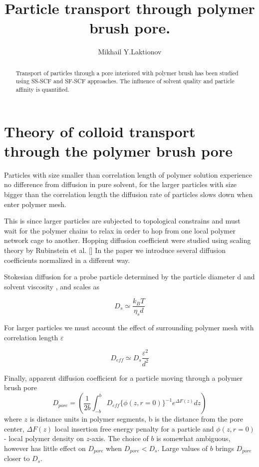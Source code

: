 \documentclass[12pt,a4paper]{article}
\begin{document}
\title{Particle transport through polymer brush pore.}

\author{Mikhail Y.Laktionov}

\maketitle

\begin{abstract}
Transport of particles through a pore interiored with polymer brush has been studied using SS-SCF and SF-SCF approaches. 
The influence of solvent quality and particle affinity is quantified.
\end{abstract}

\section{Theory of colloid transport through the polymer brush pore}

Particles with size smaller than correlation length  of polymer solution experience no difference from diffusion in pure solvent, for the larger particles with size bigger than the correlation length the diffusion rate of particles slows down when enter polymer mesh.

This is since larger particles are subjected to topological constrains and must wait for the polymer chains to relax in order to hop from one local polymer network cage to another.
Hopping diffusion coefficient were studied using scaling theory by Rubinstein et al. []
In the paper we introduce several diffusion coefficients normalized in a different way.

Stokesian diffusion for a probe particle determined by the particle diameter d and solvent viscosity , and scales as

\begin{equation}
    D_s \simeq \frac{k_B T}{\eta_s d}
\end{equation}

For larger particles we must account the effect of surrounding polymer mesh with correlation length $\varepsilon$

\begin{equation}
    D_{eff} \simeq D_s \frac{\varepsilon^2}{d^2}
\end{equation}

Finally, apparent diffusion coefficient for a particle moving through a polymer brush pore
\begin{equation}
    D_{pore} = \left( \frac{1}{2b} \int_{-b}^{b} {D_{eff} \{ \phi(z, r=0) \}}^{-1} e^{\Delta F(z)} dz \right)
\end{equation}
where $z$ is distance units in polymer segments, b is the distance from the pore center, $\Delta F(z)$ local insertion free energy penalty for a particle and $\phi(z, r=0)$ - local polymer density on $z$-axis.
The choice of $b$ is somewhat ambiguous, however has little effect on $D_{pore}$ when $D_{pore} < D_s$. Large values of $b$ brings $D_{pore}$ closer to $D_s$.
\end{document}

